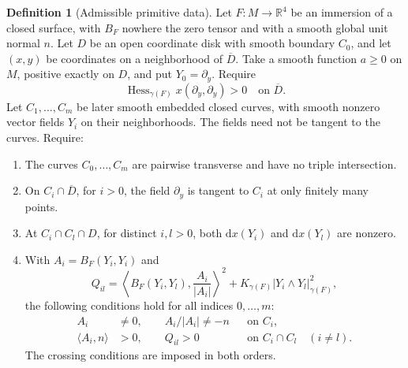 \documentclass[11pt,a4paper]{article}
\newcommand{\R}{\mathbb R}
\newcommand{\dd}{\mathrm d}
\newcommand{\Hess}{\operatorname{Hess}}
\theoremstyle{definition}
\newtheorem{definition}[theorem]{Definition}
\theoremstyle{remark}
\numberwithin{equation}{section}
\begin{document}
\begin{definition}[Admissible primitive data]
\label{def:admissible}
Let $F:M\to\R^4$ be an immersion of a closed surface, with $B_F$ nowhere
the zero tensor and with a smooth global unit normal $n$.
Let $D$ be an open coordinate disk with smooth boundary $C_0$, and let
$(x,y)$ be coordinates on a neighborhood of $\overline D$.
Take a smooth function $a\ge0$ on $M$, positive exactly on $D$, and put
$Y_0=\partial_y$. Require
\begin{equation}
 \Hess_{\gamma(F)}x(\partial_y,\partial_y)>0
 \quad\text{on }\overline D.
 \label{eq:hessian}
\end{equation}
Let $C_1,\ldots,C_m$ be later smooth embedded closed curves, with smooth
nonzero vector fields $Y_i$ on their neighborhoods. The fields need not
be tangent to the curves. Require:
\begin{enumerate}[label=(\roman*)]
\item The curves $C_0,\ldots,C_m$ are pairwise transverse and have no
triple intersection.
\item On $C_i\cap\overline D$, for $i>0$, the field $\partial_y$ is
tangent to $C_i$ at only finitely many points.
\item At $C_i\cap C_l\cap D$, for distinct $i,l>0$, both $\dd x(Y_i)$
and $\dd x(Y_l)$ are nonzero.
\item With $A_i=B_F(Y_i,Y_i)$ and
\begin{equation}
 Q_{il}=\left\langle B_F(Y_i,Y_l),\frac{A_i}{|A_i|}\right\rangle^2
       +K_{\gamma(F)}|Y_i\wedge Y_l|_{\gamma(F)}^2,
 \label{eq:Q}
\end{equation}
the following conditions hold for all indices $0,\ldots,m$:
\begin{equation}
 \begin{aligned}
 A_i&\ne0,\qquad A_i/|A_i|\ne-n &&\text{on }C_i,\\
 \langle A_i,n\rangle&>0,\qquad Q_{il}>0
             &&\text{on }C_i\cap C_l\quad(i\ne l).
 \end{aligned}
 \label{eq:boundary}
\end{equation}
The crossing conditions are imposed in both orders.
\end{enumerate}
\end{definition}
\end{document}
